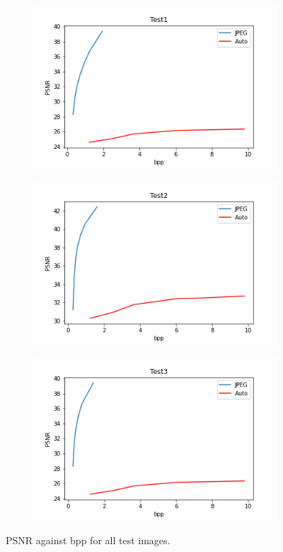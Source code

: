\documentclass{article}
\begin{document}
\begin{figure}
    \centering
    \begin{subfigure}[b]{0.7 \textwidth}
    \includegraphics[width=\textwidth]{Images/Plots/test1_PSNR.png}
    \end{subfigure}
    \begin{subfigure}[b]{0.7 \textwidth}
    \includegraphics[width=\textwidth]{Images/Plots/test2_PSNR.png}
    \end{subfigure}
    \begin{subfigure}[b]{0.7 \textwidth}
    \includegraphics[width=\textwidth]{Images/Plots/test3_PSNR.png}
    \end{subfigure}
    \caption{PSNR against bpp for all test images.}
    \label{fig:objective_PSNR}
\end{figure}
\end{document}
